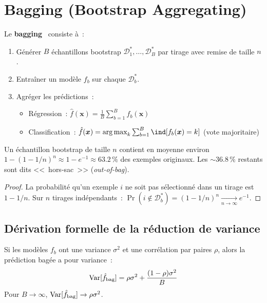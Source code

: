 \section{Bagging (Bootstrap Aggregating)}
\label{sec:bagging}

\begin{definition}[Bagging]
Le \textbf{bagging}~\cite{hastie2009} consiste \`a~:
\begin{enumerate}
  \item G\'en\'erer $B$ \'echantillons bootstrap $\mathcal{D}_1^*, \ldots,
    \mathcal{D}_B^*$ par tirage avec remise de taille $n$.
  \item Entra\^iner un mod\`ele $f_b$ sur chaque $\mathcal{D}_b^*$.
  \item Agr\'eger les pr\'edictions~:
    \begin{itemize}
      \item R\'egression~:
        $\hat{f}(\bm{x}) = \frac{1}{B}\sum_{b=1}^B f_b(\bm{x})$
      \item Classification~:
        $\hat{f}(\bm{x}) = \argmax_k \sum_{b=1}^B \ind[f_b(\bm{x}) = k]$
        (vote majoritaire)
    \end{itemize}
\end{enumerate}
\end{definition}

\begin{proposition}
Un \'echantillon bootstrap de taille $n$ contient en moyenne environ
$1 - (1 - 1/n)^n \approx 1 - e^{-1} \approx 63.2\,\%$ des exemples
originaux. Les $\sim 36.8\,\%$ restants sont dits <<~hors-sac~>>
(\emph{out-of-bag}).
\end{proposition}

\begin{proof}
La probabilit\'e qu'un exemple $i$ ne soit pas s\'electionn\'e dans un tirage
est $1 - 1/n$. Sur $n$ tirages ind\'ependants~:
$\Pr(i \notin \mathcal{D}_b^*) = (1 - 1/n)^n \xrightarrow[n \to \infty]{}
e^{-1}$.
\end{proof}

\subsection{D\'erivation formelle de la r\'eduction de variance}

\begin{theoreme}
Si les mod\`eles $f_b$ ont une variance $\sigma^2$ et une corr\'elation par
paires $\rho$, alors la pr\'ediction bag\'ee a pour variance~:
\begin{equation}
  \mathrm{Var}[\hat{f}_{\text{bag}}] = \rho\sigma^2
  + \frac{(1-\rho)\sigma^2}{B}
\end{equation}
Pour $B \to \infty$, $\mathrm{Var}[\hat{f}_{\text{bag}}] \to \rho\sigma^2$.
\end{theoreme}

